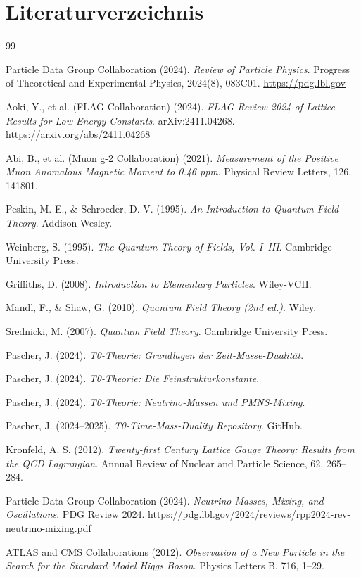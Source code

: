 	\section{Literaturverzeichnis}
	
	\begin{thebibliography}{99}
		
		Particle Data Group Collaboration (2024). 
		\textit{Review of Particle Physics}. 
		Progress of Theoretical and Experimental Physics, 2024(8), 083C01.
		\url{https://pdg.lbl.gov}
		
		Aoki, Y., et al. (FLAG Collaboration) (2024). 
		\textit{FLAG Review 2024 of Lattice Results for Low-Energy Constants}. 
		arXiv:2411.04268.
		\url{https://arxiv.org/abs/2411.04268}
		
		Abi, B., et al. (Muon g-2 Collaboration) (2021). 
		\textit{Measurement of the Positive Muon Anomalous Magnetic Moment to 0.46 ppm}. 
		Physical Review Letters, 126, 141801.
		
		Peskin, M. E., \& Schroeder, D. V. (1995). 
		\textit{An Introduction to Quantum Field Theory}. 
		Addison-Wesley.
		
		Weinberg, S. (1995). 
		\textit{The Quantum Theory of Fields, Vol. I--III}. 
		Cambridge University Press.
		
		Griffiths, D. (2008). 
		\textit{Introduction to Elementary Particles}. 
		Wiley-VCH.
		
		Mandl, F., \& Shaw, G. (2010). 
		\textit{Quantum Field Theory (2nd ed.)}. 
		Wiley.
		
		Srednicki, M. (2007). 
		\textit{Quantum Field Theory}. 
		Cambridge University Press.
		
		Pascher, J. (2024). 
		\textit{T0-Theorie: Grundlagen der Zeit-Masse-Dualität}. 

		Pascher, J. (2024). 
		\textit{T0-Theorie: Die Feinstrukturkonstante}. 

		Pascher, J. (2024). 
		\textit{T0-Theorie: Neutrino-Massen und PMNS-Mixing}. 

		Pascher, J. (2024--2025). 
		\textit{T0-Time-Mass-Duality Repository}. 
		GitHub.

		Kronfeld, A. S. (2012). 
		\textit{Twenty-first Century Lattice Gauge Theory: Results from the QCD Lagrangian}. 
		Annual Review of Nuclear and Particle Science, 62, 265--284.
		
		Particle Data Group Collaboration (2024). 
		\textit{Neutrino Masses, Mixing, and Oscillations}. 
		PDG Review 2024.
		\url{https://pdg.lbl.gov/2024/reviews/rpp2024-rev-neutrino-mixing.pdf}
		
		ATLAS and CMS Collaborations (2012). 
		\textit{Observation of a New Particle in the Search for the Standard Model Higgs Boson}. 
		Physics Letters B, 716, 1--29.
		
	\end{thebibliography}
	
